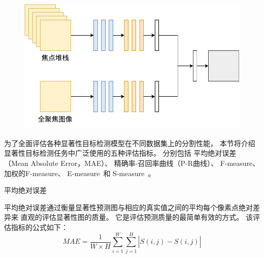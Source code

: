 %
%
\begin{figure}[!ht]
	\centering
	\includegraphics[width=0.80\linewidth]{figures/chapter2/model_of_fs_inputs}
	\label{cpt2_fig9:model_of_fs_inputs}
\end{figure}
%
%
%
%
%
%
%
%
为了全面评估各种显著性目标检测模型在不同数据集上的分割性能，
本节将介绍显著性目标检测任务中广泛使用的五种评估指标。
分别包括
平均绝对误差（Mean Absolute Error，MAE）、
精确率-召回率曲线（P-R曲线）、
F-measure\cite{achanta2009frequency}、
加权的F-measure\cite{margolin2014evaluate}、
E-measure~\cite{fan2018enhanced}和
S-measure~\cite{fan2017structure}。\par
%
%
%
%
%
%
平均绝对误差\par
平均绝对误差通过衡量显著性预测图与相应的真实值之间的平均每个像素点绝对差异来
直观的评估显著性图的质量。
它是评估预测质量的最简单有效的方式。
该评估指标的公式如下：
\begin{equation}
	MAE=\frac{1}{W \times H}\sum_{i=1}^{W} \sum_{j=1}^{H} \left |  \hat{S} (i,j) - S(i,j)\right | 
\end{equation}
